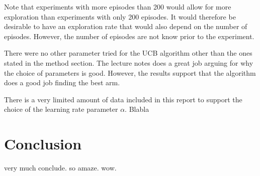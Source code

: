 \documentclass[11pt]{article}
\numberwithin{equation}{section}
\begin{document}
\begin{flushleft}
Note that experiments with more episodes than 200 would allow for more exploration than experiments with only 200 episodes. It would therefore be desirable to have an exploration rate that would also depend on the number of episodes. However, the number of episodes are not know prior to the experiment. \newline

There were no other parameter tried for the UCB algorithm other than the ones stated in the method section. The lecture notes does a great job arguing for why the choice of parameters is good. However, the results support that the algorithm does a good job finding the best arm. \newline

There is a very limited amount of data included in this report to support the choice of the learning rate parameter $\alpha$. Blabla

\section{Conclusion}

very much conclude. so amaze. wow.

\end{flushleft}
\end{document}
